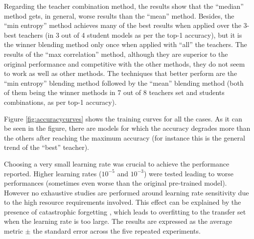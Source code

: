  Regarding the teacher combination method, the results show that the ``median'' method gets, in general, worse results than the ``mean'' method. Besides, the ``min entropy'' method achieves many of the best results when applied over the 3-best teachers (in 3 out of 4 student models as per the top-1 accuracy), but it is the winner blending method only once when applied with ``all'' the teachers. The results of the ``max correlation'' method, although they are superior to the original performance and competitive with the other methods, they do not seem to work as well as other methods. The techniques that better perform are the ``min entropy'' blending method followed by the ``mean'' blending method (both of them being the winner methods in 7 out of 8 teachers set and students combinations, as per top-1 accuracy).


Figure \ref{fig:accuracycurves}  shows the training curves for all the cases. As it can be seen in the figure, there are models for which the accuracy degrades more than the others after reaching the maximum accuracy (for instance this is the general trend of the ``best'' teacher). 

Choosing a very small learning rate was crucial to achieve the performance reported. Higher learning rates ($10^{-5}$ and  $10^{-3}$) were tested leading to worse performances (sometimes even worse than the original pre-trained model). However no exhaustive studies are performed around learning rate sensitivity due to the high resource requirements involved. This effect can be explained by the presence of catastrophic forgetting \autocite{French99}, which leads to overfitting to the transfer set when the learning rate is too large. The results are expressed as the average metric $\pm$ the standard error across the five repeated experiments.

